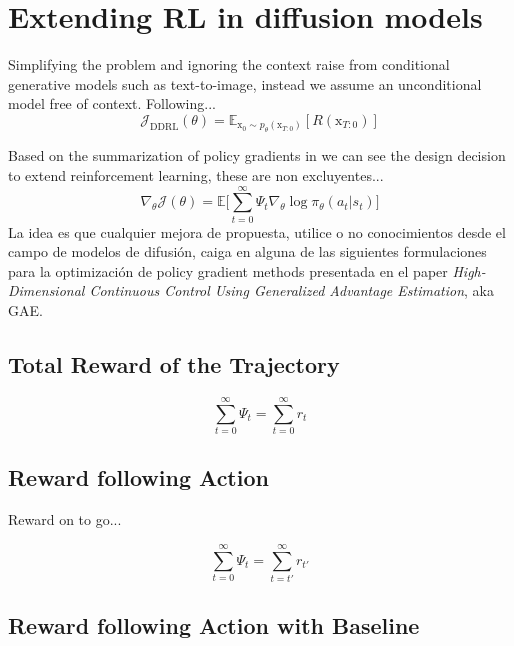 \section{Extending RL in diffusion models}

Simplifying the problem and ignoring the context raise from conditional generative models such as text-to-image, instead we assume an unconditional model free of context. Following...
\begin{equation}\label{difusion-rl-objective-2}
  \mathcal{J}_{\text{DDRL}}(\theta)
  = \mathbb{E}_{\mathrm{x}_{0}\sim p_{\theta}(\mathrm{x}_{T:0})}[R(\mathrm{x}_{T:0})]
\end{equation}

Based on the summarization of policy gradients in \cite{schulman2015high} we can see the design decision to extend reinforcement learning, these are non excluyentes...
\begin{equation}\label{eqn:general-pg-estimation-form}
  \nabla_{\theta}\mathcal{J}(\theta) = \mathbb{E}\bigg[\sum_{t=0}^{\infty}\Psi_{t}\nabla_{\theta}\log\pi_{\theta}(a_{t}|s_{t}) \bigg]
\end{equation}
La idea es que cualquier mejora de propuesta, utilice o no conocimientos
desde el campo de modelos de difusión, caiga en alguna de las siguientes
formulaciones para la optimización de policy gradient methods presentada
en el paper \textit{High-Dimensional Continuous Control Using Generalized Advantage Estimation}, aka GAE.

\subsection{Total Reward of the Trajectory}

\begin{equation}\label{eqn:psi-total-reward}
  \sum_{t=0}^{\infty}\Psi_{t} = \sum_{t=0}^{\infty} r_{t}
\end{equation}


\subsection{Reward following Action}

Reward on to go...

\begin{equation}\label{eqn:psi-reward-following-action}
  \sum_{t=0}^{\infty}\Psi_{t} = \sum_{t=t'}^{\infty} r_{t'}
\end{equation}

\subsection{Reward following Action with Baseline}

